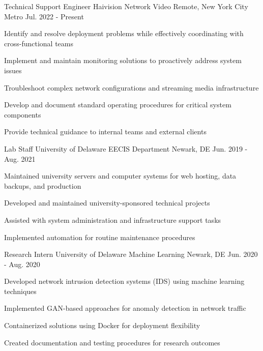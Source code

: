 \documentclass[11pt, letterpaper]{awesome-cv}
\begin{document}
\begin{cventries}

  \cventry
    {Technical Support Engineer} %
    {Haivision Network Video} %
    {Remote, New York City Metro} %
    {Jul. 2022 - Present} %
    {
      \begin{cvitems} %
        \item {Identify and resolve deployment problems while effectively coordinating with cross-functional teams}
        \item {Implement and maintain monitoring solutions to proactively address system issues}
        \item {Troubleshoot complex network configurations and streaming media infrastructure}
        \item {Develop and document standard operating procedures for critical system components}
        \item {Provide technical guidance to internal teams and external clients}
      \end{cvitems}
    }

\vspace{0.5cm}
  \cventry
    {Lab Staff}
    {University of Delaware EECIS Department}
    {Newark, DE}
    {Jun. 2019 - Aug. 2021}
    {
      \begin{cvitems}
        \item {Maintained university servers and computer systems for web hosting, data backups, and production}
        \item {Developed and maintained university-sponsored technical projects}
        \item {Assisted with system administration and infrastructure support tasks}
        \item {Implemented automation for routine maintenance procedures}
      \end{cvitems}
    }

\vspace{0.5cm}
  \cventry
    {Research Intern}
    {University of Delaware Machine Learning}
    {Newark, DE}
    {Jun. 2020 - Aug. 2020}
    {
      \begin{cvitems}
        \item {Developed network intrusion detection systems (IDS) using machine learning techniques}
        \item {Implemented GAN-based approaches for anomaly detection in network traffic}
        \item {Containerized solutions using Docker for deployment flexibility}
        \item {Created documentation and testing procedures for research outcomes}
      \end{cvitems}
    }

\end{cventries}
\end{document}

